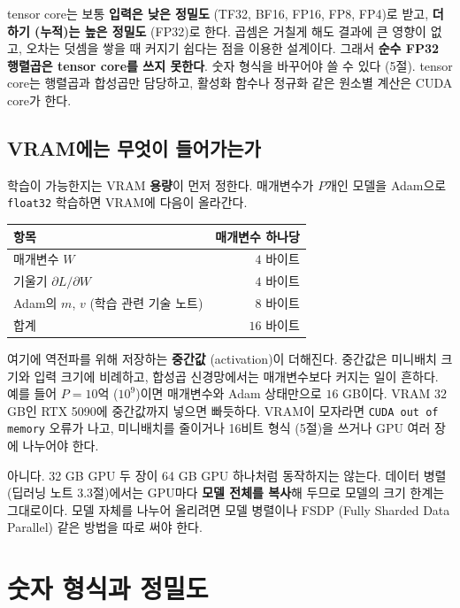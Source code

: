 \documentclass[11pt,a4paper]{article}
\begin{document}
tensor core는 보통 \textbf{입력은 낮은 정밀도} (TF32, BF16, FP16, FP8, FP4)로 받고, \textbf{더하기 (누적)는 높은 정밀도} (FP32)로 한다.
곱셈은 거칠게 해도 결과에 큰 영향이 없고, 오차는 덧셈을 쌓을 때 커지기 쉽다는 점을 이용한 설계이다.
그래서 \textbf{순수 FP32 행렬곱은 tensor core를 쓰지 못한다}. 숫자 형식을 바꾸어야 쓸 수 있다 (5절).
tensor core는 행렬곱과 합성곱만 담당하고, 활성화 함수나 정규화 같은 원소별 계산은 CUDA core가 한다.

\subsection{VRAM에는 무엇이 들어가는가}\label{sec:vram}

학습이 가능한지는 VRAM \textbf{용량}이 먼저 정한다. 매개변수가 $P$개인 모델을 Adam으로 \texttt{float32} 학습하면 VRAM에 다음이 올라간다.

\begin{center}
{\small
\begin{tabular}{@{}lr@{}}
\toprule
항목 & 매개변수 하나당 \\
\midrule
매개변수 $W$ & $4$ 바이트 \\
기울기 $\partial L/\partial W$ & $4$ 바이트 \\
Adam의 $m$, $v$ (학습 관련 기술 노트) & $8$ 바이트 \\
\midrule
합계 & $16$ 바이트 \\
\bottomrule
\end{tabular}}
\end{center}

여기에 역전파를 위해 저장하는 \textbf{중간값} (activation)이 더해진다. 중간값은 미니배치 크기와 입력 크기에 비례하고, 합성곱 신경망에서는 매개변수보다 커지는 일이 흔하다.
예를 들어 $P=10$억 ($10^9$)이면 매개변수와 Adam 상태만으로 $16$ GB이다. VRAM $32$ GB인 RTX 5090에 중간값까지 넣으면 빠듯하다.
VRAM이 모자라면 \texttt{CUDA out of memory} 오류가 나고, 미니배치를 줄이거나 16비트 형식 (5절)을 쓰거나 GPU 여러 장에 나누어야 한다.

\begin{remarkbox}
아니다. 32 GB GPU 두 장이 64 GB GPU 하나처럼 동작하지는 않는다.
데이터 병렬 (딥러닝 노트 3.3절)에서는 GPU마다 \textbf{모델 전체를 복사}해 두므로 모델의 크기 한계는 그대로이다.
모델 자체를 나누어 올리려면 모델 병렬이나 FSDP (Fully Sharded Data Parallel) 같은 방법을 따로 써야 한다.
\end{remarkbox}

\section{숫자 형식과 정밀도}\label{sec:formats}
\end{document}
